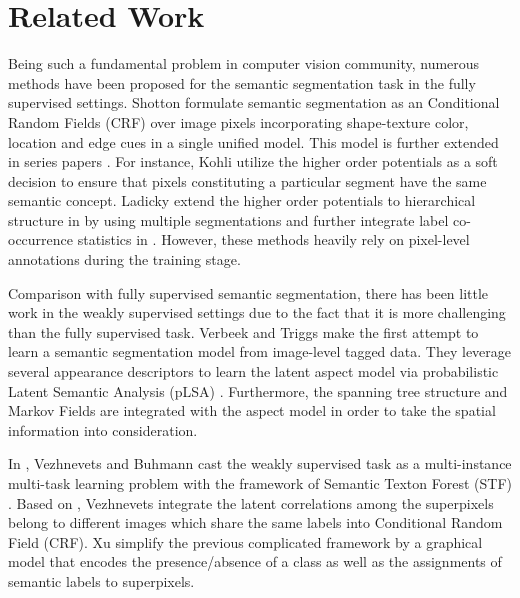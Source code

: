 \section{Related Work}
Being such a fundamental problem in computer vision community, numerous methods have been proposed for the semantic segmentation task in the fully supervised settings. Shotton \etal \cite{shotton2006textonboost} formulate semantic segmentation as an Conditional Random Fields (CRF) over image pixels incorporating shape-texture color, location and edge cues in a single unified model. This model is further extended in series papers \cite{kohli2009robust,ladicky2009associative,ladicky2010graph}. For instance, Kohli \etal utilize the higher order potentials \cite{kohli2009robust} as a soft decision to ensure that pixels constituting a particular segment have the same semantic concept. Ladicky \etal extend the higher order potentials to hierarchical structure in \cite{ladicky2009associative} by using multiple segmentations and further integrate label co-occurrence statistics in \cite{ladicky2010graph}. However, these methods heavily rely on pixel-level annotations during the training stage.

Comparison with fully supervised semantic segmentation, there has been little work in the weakly supervised settings due to the fact that it is more challenging than the fully supervised task. Verbeek and Triggs \cite{verbeek2007region} make the first attempt to learn a semantic segmentation model from image-level tagged data. They leverage several appearance descriptors to learn the latent aspect model via probabilistic Latent Semantic Analysis (pLSA) \cite{hofmann1999probabilistic}. Furthermore, the spanning tree structure and Markov Fields are integrated with the aspect model in order to take the spatial information into consideration.

In \cite{vezhnevets2010towards}, Vezhnevets and Buhmann cast the weakly supervised task as a multi-instance multi-task learning problem with the framework of Semantic Texton Forest (STF) \cite{shotton2008semantic}. Based on \cite{vezhnevets2010towards}, Vezhnevets \etal \cite{vezhnevets2011weakly,vezhnevets2012weakly} integrate the latent correlations among the superpixels belong to different images which share the same labels into Conditional Random Field (CRF). Xu \etal \cite{xu2014tell} simplify the previous complicated framework by a graphical model that encodes the presence/absence of a class as well as the assignments of semantic labels to superpixels.

